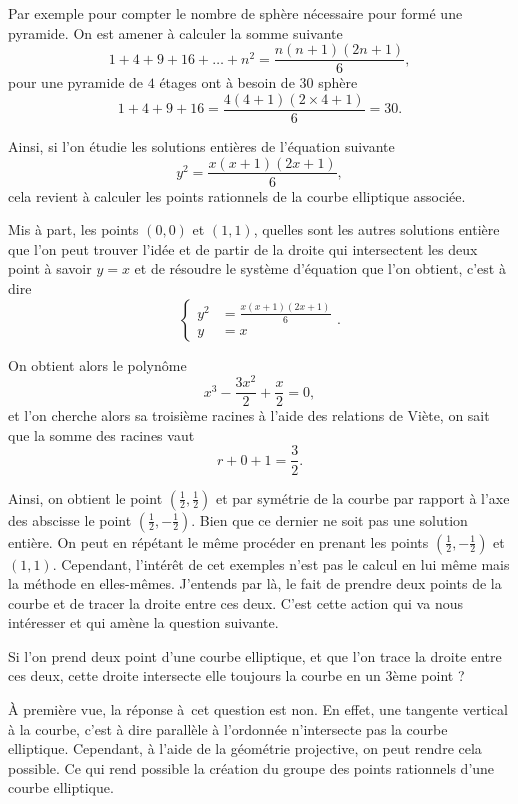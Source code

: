 Par exemple pour compter le nombre de sphère nécessaire pour formé une
pyramide. On est amener à calculer la somme suivante
\[
1 + 4 + 9 + 16 + \ldots + n^2 = \frac{n\left( n+1 \right) \left( 2n+1 \right) }{6}
,\] 
pour une pyramide de $4$ étages ont à besoin de 30 sphère 
\[
1 + 4 + 9 + 16 = \frac{4\left( 4 + 1 \right) \left( 2 \times 4 + 1 \right) }{6} = 30
.\] 

Ainsi, si l'on étudie les solutions entières de l'équation suivante
\[
y^2 = \frac{x\left( x+1 \right) \left( 2x+1 \right) }{6}
,\] 
cela revient à calculer les
points rationnels de la courbe elliptique associée. 

Mis à part, les points $(0,0)$ et $(1,1)$, quelles sont les autres solutions entière que l'on
peut trouver l'idée et de partir de la droite qui intersectent les deux point à
savoir $y=x$ et de résoudre le système d'équation que l'on obtient, c'est à dire
\[
\begin{cases}
    y^2 &= \frac{x\left( x+1 \right) \left( 2x+1 \right) }{6} \\
    y &= x 
\end{cases}
.\] 

On obtient alors le polynôme 
\[
x^3 - \frac{3x^2}{2}+\frac{x}{2} = 0
,\] 
et l'on cherche alors sa troisième racines à l'aide des relations de Viète, on sait que
la somme des racines vaut 
\[
r + 0 + 1 = \frac{3}{2}
.\] 

Ainsi, on obtient le point $(\frac{1}{2},\frac{1}{2})$ et par symétrie de la courbe par rapport à l'axe des
abscisse le point
$(\frac{1}{2},-\frac{1}{2})$. Bien que ce dernier ne soit pas une solution entière. On peut en
répétant le même procéder en prenant les points $\left( \frac{1}{2},-\frac{1}{2} \right)
$ et $\left( 1,1 \right) $. Cependant, l'intérêt de cet exemples n'est pas le calcul en
lui même mais la méthode en elles-mêmes. J'entends par là, le fait de prendre deux points de la
courbe et de tracer la droite entre ces deux. C'est cette action qui va nous intéresser et
qui amène la question suivante.

Si l'on prend deux point d'une courbe elliptique, et que l'on trace la droite entre ces deux,
cette droite intersecte elle toujours la courbe en un 3ème point ?

À première vue, la réponse à cet question est non. En effet, une tangente vertical à la
courbe, c'est à dire parallèle à l'ordonnée n'intersecte pas la courbe elliptique. Cependant, à l'aide de la géométrie
projective, on peut rendre cela possible. Ce qui rend possible la création du groupe
des points rationnels d'une courbe elliptique.

